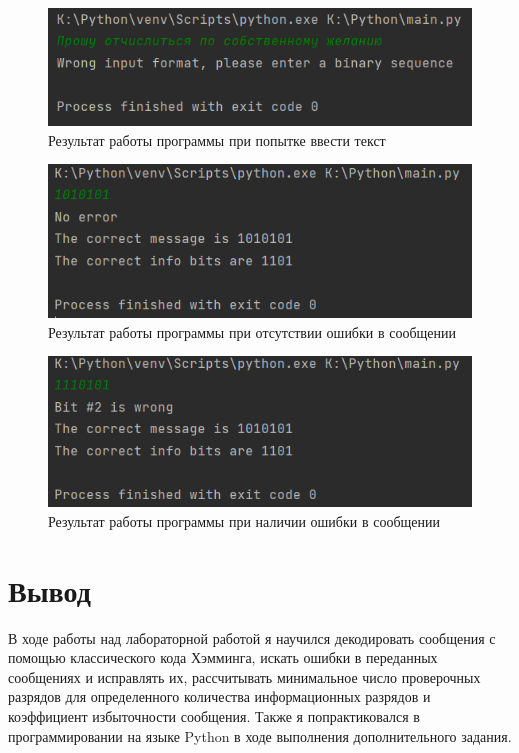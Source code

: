 \documentclass[12pt]{article}
\begin{document}
\begin{figure}[h]
    \centering
    \includegraphics[width=0.92\linewidth]{img/image5.png}
    \caption{Результат работы программы при попытке ввести текст}
\end{figure}

\begin{figure}[h]
    \centering
    \includegraphics[width=0.92\linewidth]{img/image6.png}
    \caption{Результат работы программы при отсутствии ошибки в сообщении}
\end{figure}

\newpage

\begin{figure}[h]
    \centering
    \includegraphics[width=0.92\linewidth]{img/image7.png}
    \caption{Результат работы программы при наличии ошибки в сообщении}
\end{figure}

\newpage

\section{Вывод}

В ходе работы над лабораторной работой я научился декодировать сообщения с помощью классического кода Хэмминга, искать ошибки в переданных сообщениях и исправлять их, рассчитывать минимальное число проверочных разрядов для определенного количества информационных разрядов и коэффициент избыточности сообщения. Также я попрактиковался в программировании на языке Python в ходе выполнения дополнительного задания.
\end{document}
